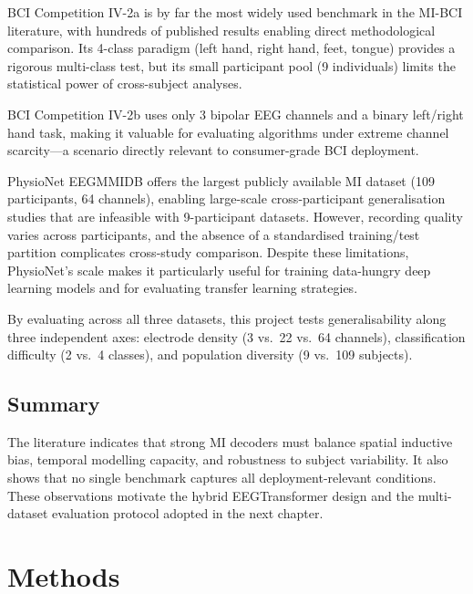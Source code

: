 \documentclass[12pt, a4paper]{article}
\begin{document}
BCI Competition IV-2a is by far the most widely used benchmark in the MI-BCI literature, with hundreds of published results enabling direct methodological comparison. Its 4-class paradigm (left hand, right hand, feet, tongue) provides a rigorous multi-class test, but its small participant pool (9 individuals) limits the statistical power of cross-subject analyses.

BCI Competition IV-2b uses only 3 bipolar EEG channels and a binary left/right hand task, making it valuable for evaluating algorithms under extreme channel scarcity---a scenario directly relevant to consumer-grade BCI deployment.

PhysioNet EEGMMIDB offers the largest publicly available MI dataset (109 participants, 64 channels), enabling large-scale cross-participant generalisation studies that are infeasible with 9-participant datasets. However, recording quality varies across participants, and the absence of a standardised training/test partition complicates cross-study comparison. Despite these limitations, PhysioNet's scale makes it particularly useful for training data-hungry deep learning models and for evaluating transfer learning strategies.

By evaluating across all three datasets, this project tests generalisability along three independent axes: electrode density (3 vs.\ 22 vs.\ 64 channels), classification difficulty (2 vs.\ 4 classes), and population diversity (9 vs.\ 109 subjects).

\subsection{Summary}

The literature indicates that strong MI decoders must balance spatial inductive bias, temporal modelling capacity, and robustness to subject variability. It also shows that no single benchmark captures all deployment-relevant conditions. These observations motivate the hybrid EEGTransformer design and the multi-dataset evaluation protocol adopted in the next chapter.

\section{Methods}
\end{document}
